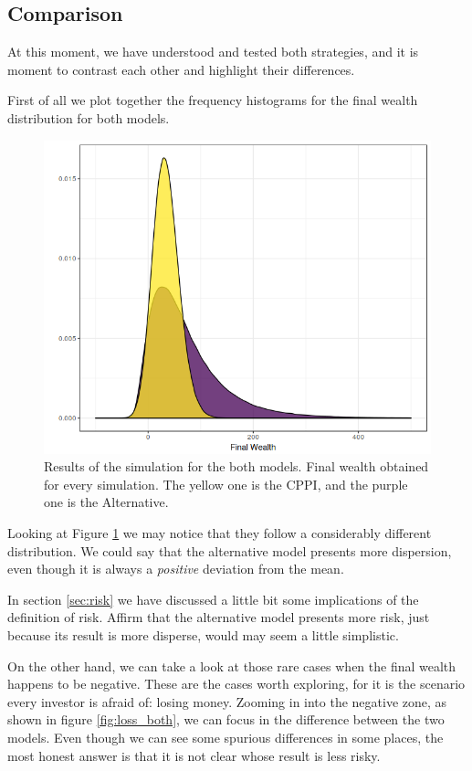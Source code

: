 \subsection{Comparison}

At this moment, we have understood and tested both strategies, and it is moment to contrast each other and highlight their differences.

First of all we plot together the frequency histograms for the final wealth distribution for both models.

\begin{figure}[H]
    \centering
    \includegraphics[scale=0.65]{./images/fw_both.png}
    \caption{Results of the simulation for the both models. Final wealth obtained for every simulation. The yellow one is the CPPI, and the purple one is the Alternative.}
    \label{fig:both_fw}
\end{figure}

Looking at Figure \ref{fig:both_fw} we may notice that they follow a considerably different distribution. We could say that the alternative model presents more dispersion, even though it is always a \textit{positive} deviation from the mean. 

In section \ref{sec:risk} we have discussed a little bit some implications of the definition of risk. Affirm that the alternative model presents more risk, just because its result is more disperse, would may seem a little simplistic. 

On the other hand, we can take a look at those rare cases when the final wealth happens to be negative. These are the cases worth exploring, for it is the scenario every investor is afraid of: losing money. Zooming in into the negative zone, as shown in figure \ref{fig:loss_both}, we can focus in the difference between the two models. Even though we can see some spurious differences in some places, the most honest answer is that it is not clear whose result is less risky.

